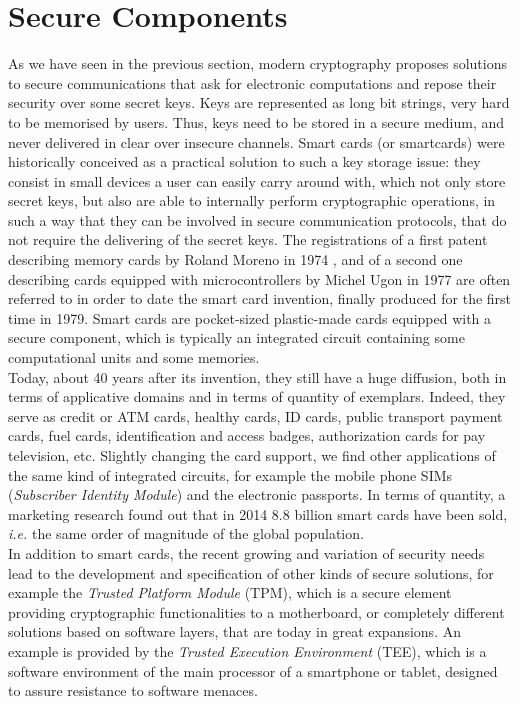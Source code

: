 \section{Secure Components}

As we have seen in the previous section, modern cryptography proposes solutions to secure communications that ask for electronic computations and repose their security over some secret keys. Keys are represented as long bit strings, very hard to be memorised by users. Thus, keys need to be stored in a secure medium, and never delivered in clear over insecure channels. Smart cards (or smartcards) were historically conceived as a practical solution to such a key storage issue: they consist in small devices a user can easily carry around with, which not only store secret keys, but also are able to internally perform cryptographic operations, in such a way that they can be involved in secure communication protocols, that do not require the delivering of the secret keys. The registrations of a first patent describing memory cards by Roland Moreno in 1974 \cite{moreno}, and of a second one describing cards equipped with microcontrollers by Michel Ugon in 1977 \cite{ugon} are often referred to in order to date the smart card invention, finally produced for the first time in 1979. Smart cards are pocket-sized plastic-made cards equipped with a secure component, which is typically an integrated circuit containing some computational units and some memories.\\

Today, about 40 years after its invention, they still have a huge diffusion, both in terms of applicative domains and in terms of quantity of exemplars. Indeed, they serve as credit or ATM cards, healthy cards, ID cards, public transport payment cards, fuel cards, identification and access badges, authorization cards for pay television, etc. Slightly changing the card support, we find other applications of the same kind of integrated circuits, for example the  mobile phone SIMs (\emph{Subscriber Identity Module}) and the electronic passports. In terms of quantity, a marketing research \cite{ABI} found out that in 2014 8.8 billion smart cards have been sold, \emph{i.e.} the same order of magnitude of the global population. \\

In addition to smart cards, the recent growing and variation of security needs lead to the development and specification of other kinds of secure solutions, for example the \emph{Trusted Platform Module} 
(TPM), which is a secure element providing cryptographic functionalities to a motherboard, or completely different solutions based on software layers, that are today in great expansions. An example is provided by the \emph{Trusted Execution Environment} (TEE), which is a software environment of the main processor of a smartphone or tablet, designed to assure resistance to software menaces. 

